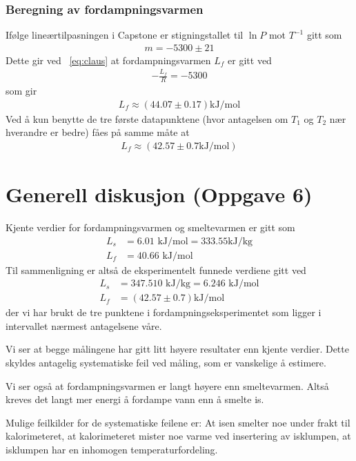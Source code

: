 \documentclass[aps,reprint]{revtex4-1}
\begin{document}
\subsubsection{Beregning av fordampningsvarmen}
Ifølge lineærtilpasningen i Capstone er stigningstallet til $\ln P$ mot
$T^{-1}$ gitt som
\begin{align*}
  m = -5300 \pm 21
\end{align*}
Dette gir ved ~\ref{eq:claus} at fordampningsvarmen $L_f$ er gitt ved
\begin{align*}
  -\frac{L_f}{R} = -5300
\end{align*}
som gir
\begin{align}
  L_f \approx (44.07 \pm 0.17) \text{kJ/mol}
\end{align}
Ved å kun benytte de tre første datapunktene (hvor antagelsen om $T_1$ og $T_2$ nær hverandre er bedre)
fåes på samme måte at
\begin{align}
  L_f \approx (42.57 \pm 0.7 \text{kJ/mol})
\end{align}
\section{Generell diskusjon (Oppgave 6)}
Kjente verdier for fordampningsvarmen og smeltevarmen er gitt som
\begin{align}
  L_s &= 6.01 \text{ kJ/mol} = 333.55 \text{kJ/kg}\\
  L_f &= 40.66 \text{ kJ/mol}
\end{align}
Til sammenligning er altså de eksperimentelt funnede verdiene gitt ved
\begin{align}
  L_s &= 347.510 \text{ kJ/kg} = 6.246 \text{ kJ/mol} \\
  L_f &= (42.57 \pm 0.7) \text{kJ/mol}
\end{align}
der vi har brukt de tre punktene i fordampningseksperimentet som ligger i
intervallet nærmest antagelsene våre.

Vi ser at begge målingene har gitt litt høyere resultater enn kjente verdier.
Dette skyldes antagelig systematiske feil ved måling, som er vanskelige å estimere.

Vi ser også at fordampningsvarmen er langt høyere enn smeltevarmen. Altså kreves
det langt mer energi å fordampe vann enn å smelte is.

Mulige feilkilder for de systematiske feilene er: At isen smelter noe under
frakt til kalorimeteret, at kalorimeteret mister noe varme ved insertering av
isklumpen, at isklumpen har en inhomogen temperaturfordeling. 
\end{document}
